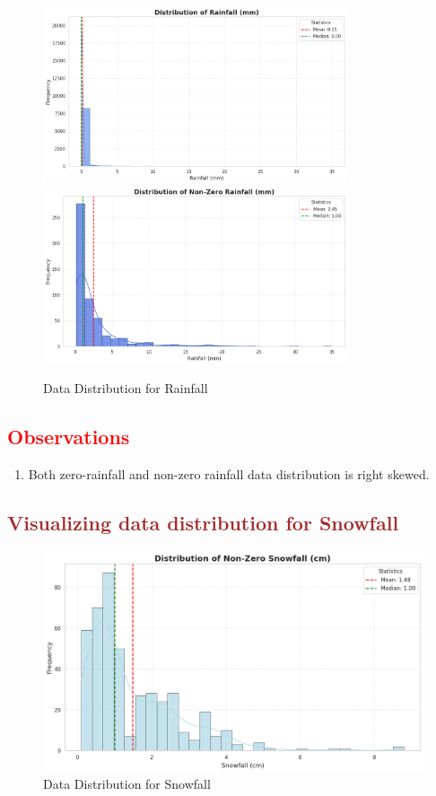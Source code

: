 \documentclass[12pt, letterpaper]{article}
\begin{document}
\begin{figure}[h]
  \centering
  \includegraphics[width=0.8\textwidth]{rainfall1.png}
  \includegraphics[width=0.8\textwidth]{rainfall2.png}
  \caption{Data Distribution for Rainfall}
\end{figure}

\subsection*{\textcolor{red}{Observations}}
\begin{enumerate}
  \item Both zero-rainfall and non-zero rainfall data distribution is right skewed.
\end{enumerate}

\newpage  

\subsection*{\textcolor{brown}{Visualizing data distribution for Snowfall}}

\begin{figure}[h]
  \centering
  \includegraphics[width=1\textwidth]{snowfall.png}
  \caption{Data Distribution for Snowfall}
\end{figure}
\end{document}

